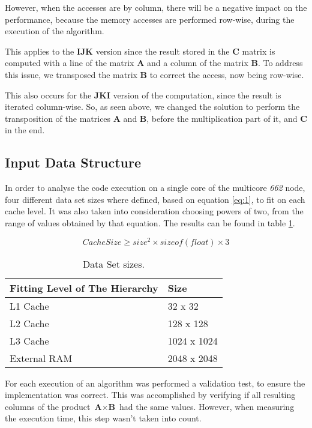 \documentclass[twoside,twocolumn]{article}
\begin{document}
However, when the accesses are by column, there will be a negative impact on the performance, because the memory accesses are performed row-wise, during the execution of the algorithm.

This applies to the \textbf{IJK} version since the result stored in the \textbf{C} matrix is computed with a line of the matrix \textbf{A} and a column of the matrix \textbf{B}.  To address this issue, we transposed the matrix \textbf{B} to correct the access, now being row-wise.

This also occurs for the \textbf{JKI} version of the computation, since the result is iterated column-wise. So, as seen above, we changed the solution to perform the transposition of the matrices \textbf{A} and \textbf{B}, before the multiplication part of it, and \textbf{C} in the end.

\subsection{Input Data Structure}

In order to analyse the code execution on a single core of the multicore \emph{662} node, four different data set sizes where defined, based on equation \ref{eq:1}, to fit on each cache level. It was also taken into consideration choosing powers of two, from the range of values obtained by that equation. The results can be found in table \ref{tab:datasetsizes}.

\begin{equation} \label{eq:1}
    Cache Size \geqslant size^{2} \times sizeof(float) \times 3
\end{equation}

\begin{table}[ht]
\begin{tabular}{|l|l|}
\hline
Fitting Level of The Hierarchy & Size                            \\ \hline
L1 Cache                       & 32 x 32     \\ \hline
L2 Cache                       & 128 x 128   \\ \hline
L3 Cache                       & 1024 x 1024 \\ \hline
External RAM                   & 2048 x 2048 \\ \hline
\end{tabular}
\caption{Data Set sizes.}
\label{tab:datasetsizes}
\end{table}

For each execution of an algorithm was performed a validation test, to ensure the implementation was correct. This was accomplished by verifying if all resulting columns of the product $\textbf{A} \times \textbf{B}$ had the same values. However, when measuring the execution time, this step wasn't taken into count.
\end{document}
